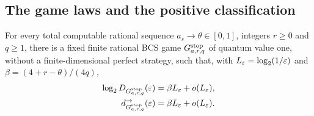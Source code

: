 \subsection{The game laws and the positive classification}\label{sec:classification-laws}
\begin{theorem}\label{thm:limit-resources}
For every total computable rational sequence $a_s\to\theta\in[0,1]$, integers $r\ge0$ and $q\ge1$, there is a fixed finite rational BCS game $G^{\rm stop}_{a,r,q}$ of quantum value one, without a finite-dimensional perfect strategy, such that, with $L_\varepsilon=\log_2(1/\varepsilon)$ and $\beta=(4+r-\theta)/(4q)$,
\begin{equation}\label{eq:limit-resource-laws}
\begin{aligned}
 \log_2D_{G^{\rm stop}_{a,r,q}}(\varepsilon)&=\beta L_\varepsilon+o(L_\varepsilon),\\
 d^\to_{G^{\rm stop}_{a,r,q}}(\varepsilon)&=\beta L_\varepsilon+o(L_\varepsilon).
\end{aligned}
\end{equation}
\end{theorem}
